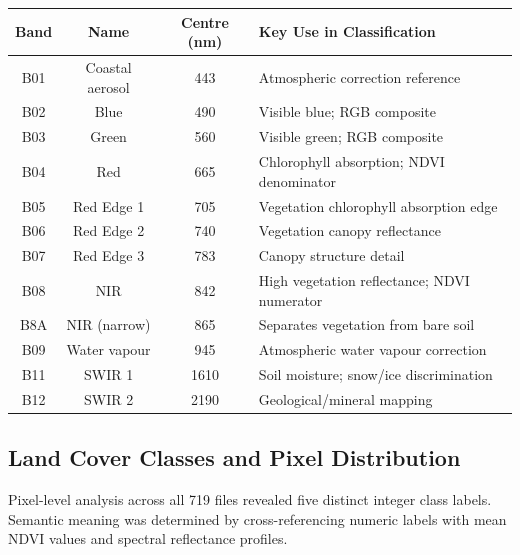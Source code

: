 \documentclass[12pt, a4paper]{article}
\begin{document}
\begin{center}
\renewcommand{\arraystretch}{1.2}
\begin{tabular}{cccl}
\toprule
\textbf{Band} & \textbf{Name} & \textbf{Centre (nm)} & \textbf{Key Use in Classification} \\
\midrule
\rowcolor{rowalt}
B01 & Coastal aerosol & 443  & Atmospheric correction reference \\
B02 & Blue            & 490  & Visible blue; RGB composite \\
\rowcolor{rowalt}
B03 & Green           & 560  & Visible green; RGB composite \\
B04 & Red             & 665  & Chlorophyll absorption; NDVI denominator \\
\rowcolor{rowalt}
B05 & Red Edge 1      & 705  & Vegetation chlorophyll absorption edge \\
B06 & Red Edge 2      & 740  & Vegetation canopy reflectance \\
\rowcolor{rowalt}
B07 & Red Edge 3      & 783  & Canopy structure detail \\
B08 & NIR             & 842  & High vegetation reflectance; NDVI numerator \\
\rowcolor{rowalt}
B8A & NIR (narrow)    & 865  & Separates vegetation from bare soil \\
B09 & Water vapour    & 945  & Atmospheric water vapour correction \\
\rowcolor{rowalt}
B11 & SWIR 1          & 1610 & Soil moisture; snow/ice discrimination \\
B12 & SWIR 2          & 2190 & Geological/mineral mapping \\
\bottomrule
\end{tabular}
\end{center}

\subsection{Land Cover Classes and Pixel Distribution}
\label{sec:classes}

Pixel-level analysis across all 719 files revealed five distinct integer class labels. Semantic meaning was determined by cross-referencing numeric labels with mean NDVI values and spectral reflectance profiles.
\end{document}
